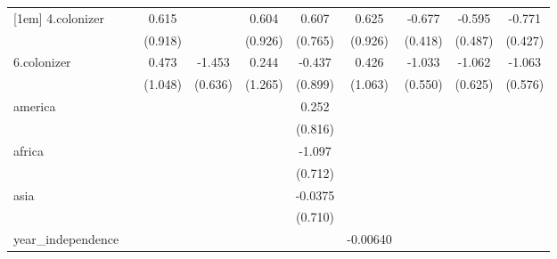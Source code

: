 {\begin{tabular}{l*{9}{c}}
[1em]
4.colonizer &                     &       0.615         &                     &       0.604         &       0.607         &       0.625         &      -0.677         &      -0.595         &      -0.771\sym{*}  \\
            &                     &     (0.918)         &                     &     (0.926)         &     (0.765)         &     (0.926)         &     (0.418)         &     (0.487)         &     (0.427)         \\
[1em]
6.colonizer &                     &       0.473         &      -1.453\sym{**} &       0.244         &      -0.437         &       0.426         &      -1.033\sym{*}  &      -1.062         &      -1.063\sym{*}  \\
            &                     &     (1.048)         &     (0.636)         &     (1.265)         &     (0.899)         &     (1.063)         &     (0.550)         &     (0.625)         &     (0.576)         \\
[1em]
america     &                     &                     &                     &                     &       0.252         &                     &                     &                     &                     \\
            &                     &                     &                     &                     &     (0.816)         &                     &                     &                     &                     \\
[1em]
africa      &                     &                     &                     &                     &      -1.097         &                     &                     &                     &                     \\
            &                     &                     &                     &                     &     (0.712)         &                     &                     &                     &                     \\
[1em]
asia        &                     &                     &                     &                     &     -0.0375         &                     &                     &                     &                     \\
            &                     &                     &                     &                     &     (0.710)         &                     &                     &                     &                     \\
[1em]
year\_independence&                     &                     &                     &                     &                     &    -0.00640         &                     &                     &                     \\

\end{tabular}}
